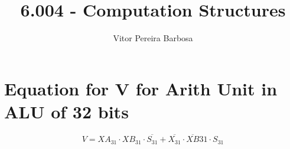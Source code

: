 \documentclass[11pt]{article}
\title{6.004 - Computation Structures}
\author{Vitor Pereira Barbosa}
\date{}
\begin{document}
        \maketitle
                \section*{Equation for V for Arith Unit in ALU of 32 bits}

        \vspace{12pt}

            \begin{equation}
            V = XA_{31}\cdot XB_{31}\cdot \overline{S_{31}} + \overline{X_{31}}\cdot \overline{XB}{31}\cdot S_{31}
            \end{equation}

        \vspace{12pt}
\end{document}
